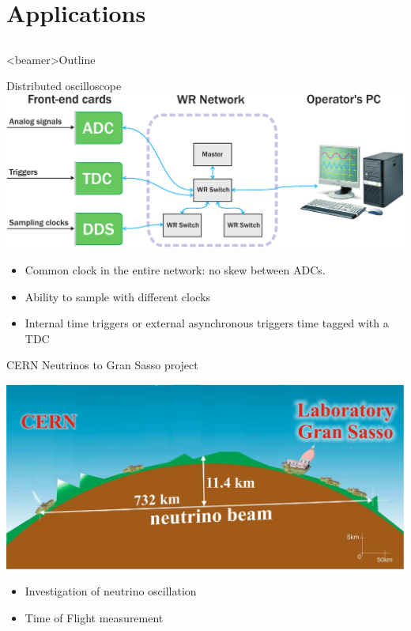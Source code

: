 \documentclass[compress,red]{beamer}
\begin{document}
\section{Applications}
\subsection{}
\begin{frame}<beamer>{Outline}
    \tableofcontents [currentsection]
\end{frame}

\begin{frame}{Distributed oscilloscope}
  \includegraphics[width=.8\textwidth]{applications/distr_oscill.pdf}
  \begin{block}{}
    \begin{itemize}
      \item Common clock in the entire network: no skew between ADCs.
      \item Ability to sample with different clocks
      \item Internal time triggers or external asynchronous triggers time tagged
        with a TDC
    \end{itemize}
  \end{block}
\end{frame}

\begin{frame}{CERN Neutrinos to Gran Sasso project}
  \begin{center}
    \includegraphics[width=.8\textwidth]{applications/cngs-general.pdf}
  \end{center}
  \begin{itemize}
    \item Investigation of neutrino oscillation
    \item Time of Flight measurement
  \end{itemize}
\end{frame}
\end{document}
